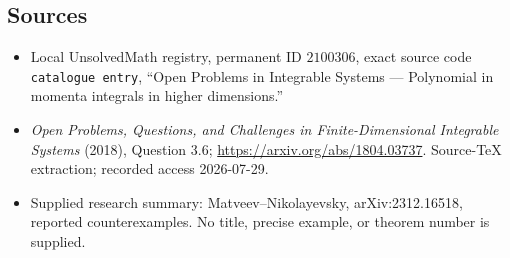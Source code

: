 \documentclass[11pt]{article}
\begin{document}
\subsection{Sources}
\begin{itemize}
\item Local UnsolvedMath registry, permanent ID \(2100306\), exact source code \texttt{catalogue entry}, ``Open Problems in Integrable Systems --- Polynomial in momenta integrals in higher dimensions.''
\item \emph{Open Problems, Questions, and Challenges in Finite-Dimensional Integrable Systems} (2018), Question 3.6; \url{https://arxiv.org/abs/1804.03737}. Source-TeX extraction; recorded access 2026-07-29.
\item Supplied research summary: Matveev--Nikolayevsky, arXiv:2312.16518, reported counterexamples. No title, precise example, or theorem number is supplied.
\end{itemize}
\end{document}
